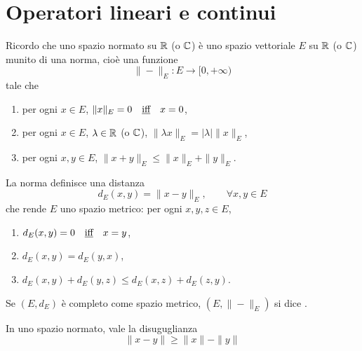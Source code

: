 \chapter{Operatori lineari e continui}
Ricordo che uno spazio normato su $\mathbb{R}$ (o $\mathbb{C}$) è uno spazio vettoriale $E$ su $\mathbb{R}$ (o $\mathbb{C}$) munito di una norma, cioè una funzione
$$
	\| - \|_E : E \to [0,+\infty)
$$
tale che
\begin{enumerate}
	\item per ogni $x \in E$, $\|x\|_E = 0 \quad\text{\underline{iff}}\quad x=0$,
	\item per ogni $x \in E$, $\lambda \in \mathbb{R}$ (o $\mathbb{C}$), $\|\lambda x \|_E = |\lambda|\|x\|_E$,
	\item per ogni $x,y \in E$, $\|x + y\|_E \leq \|x\|_E + \|y\|_E$.
\end{enumerate}
La norma definisce una distanza
$$
	d_E(x,y) = \|x-y\|_E, \qquad \forall x, y \in E
$$
che rende $E$ uno spazio metrico: per ogni $x,y,z \in E$,
\begin{enumerate}
	\item $d_E(x,y) = 0 \quad\text{\underline{iff}}\quad x=y$,
	\item $d_E(x,y) = d_E(y,x)$,
	\item $d_E(x,y) + d_E(y,z) \leq d_E(x,z) + d_E(z,y)$.
\end{enumerate}
Se $(E, d_E)$ è completo come spazio metrico, $(E, \|-\|_E)$ si dice .

\begin{lemma}
\label{lemma:reverse_triang_ineq}
	In uno spazio normato, vale la disuguglianza
	\begin{equation}
		\|x-y\| \geq \|x\|-\|y\|
	\end{equation}
\end{lemma}

